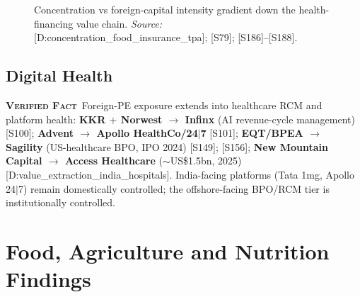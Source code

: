 \documentclass[11pt,a4paper]{article}
\newcommand{\VF}{\textcolor{vfcol}{\textsc{\textbf{Verified Fact}}}}
\newcommand{\cs}[1]{\textnormal{[#1]}}
\begin{document}
\begin{figure}[htbp]
\centering
{}
\caption{Concentration vs foreign-capital intensity gradient down the health-financing value chain. \textit{Source:} \cs{D:concentration\_food\_insurance\_tpa}; \cs{S79}; \cs{S186}--\cs{S188}.}
\label{fig:dg5gradient}
\end{figure}

\subsection{Digital Health}

\VF\ Foreign-PE exposure extends into healthcare RCM and platform health: \textbf{KKR $+$ Norwest $\rightarrow$ Infinx} (AI revenue-cycle management) \cs{S100}; \textbf{Advent $\rightarrow$ Apollo HealthCo/24$|$7} \cs{S101}; \textbf{EQT/BPEA $\rightarrow$ Sagility} (US-healthcare BPO, IPO 2024) \cs{S149}; \cs{S156}; \textbf{New Mountain Capital $\rightarrow$ Access Healthcare} ($\sim$US\$1.5bn, 2025) \cs{D:value\_extraction\_india\_hospitals}. India-facing platforms (Tata 1mg, Apollo 24$|$7) remain domestically controlled; the offshore-facing BPO/RCM tier is institutionally controlled.

\section{Food, Agriculture and Nutrition Findings}\label{sec:food}
\end{document}
